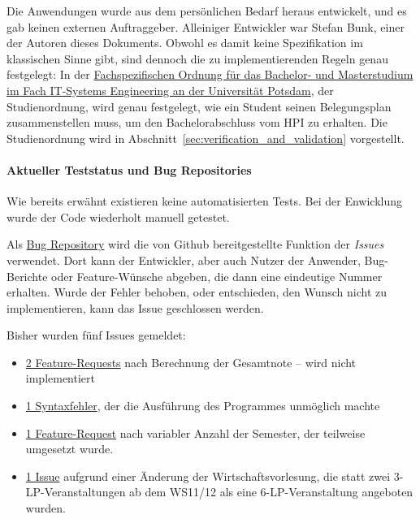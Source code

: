 \documentclass[ngerman]{article}
\begin{document}
Die Anwendungen wurde aus dem persönlichen Bedarf heraus entwickelt, und es gab keinen externen Auftraggeber.
Alleiniger Entwickler war Stefan Bunk, einer der Autoren dieses Dokuments.
Obwohl es damit keine Spezifikation im klassischen Sinne gibt, sind dennoch die zu implementierenden Regeln genau festgelegt:
In der \href{http://www.uni-potsdam.de/ambek/ambek2010/15/Seite3.pdf}{Fachspezifischen Ordnung für das Bachelor- und Masterstudium im Fach IT-Systems Engineering an der Universität Potsdam}, der Studienordnung, wird genau festgelegt, wie ein Student seinen Belegungsplan zusammenstellen muss, um den Bachelorabschluss vom HPI zu erhalten.
Die Studienordnung wird in Abschnitt~\ref{sec:verification_and_validation} vorgestellt.

\paragraph{Aktueller Teststatus und Bug Repositories}

Wie bereits erwähnt existieren keine automatisierten Tests.
Bei der Enwicklung wurde der Code wiederholt manuell getestet.

Als \href{https://github.com/knub/onehundredandeighty/issues?q=is:issue}{Bug Repository} wird die von Github bereitgestellte Funktion der \emph{Issues} verwendet.
Dort kann der Entwickler, aber auch Nutzer der Anwender, Bug-Berichte oder Feature-Wünsche abgeben, die dann eine eindeutige Nummer erhalten.
Wurde der Fehler behoben, oder entschieden, den Wunsch nicht zu implementieren, kann das Issue geschlossen werden.

Bisher wurden fünf Issues gemeldet:
\begin{itemize}
    \item
        \href{https://github.com/knub/onehundredandeighty/issues/30}{2 Feature-Requests} nach Berechnung der Gesamtnote -- wird nicht implementiert
    \item
        \href{https://github.com/knub/onehundredandeighty/issues/20}{1 Syntaxfehler}, der die Ausführung des Programmes unmöglich machte
    \item
        \href{https://github.com/knub/onehundredandeighty/issues/4}{1 Feature-Request} nach variabler Anzahl der Semester, der teilweise umgesetzt wurde.
    \item
        \href{https://github.com/knub/onehundredandeighty/pull/5}{1 Issue} aufgrund einer Änderung der Wirtschaftsvorlesung, die statt zwei 3-LP-Veranstaltungen ab dem WS11/12 als eine 6-LP-Veranstaltung angeboten wurden.
\end{itemize}
\end{document}
